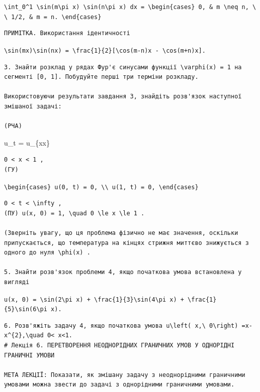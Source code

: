 \documentclass[
  ukrainian,
]{article}
\begin{document}
\texttt{\textbackslash{}int\_0\^{}1\ \textbackslash{}sin(m\textbackslash{}pi\ x)\ \textbackslash{}sin(n\textbackslash{}pi\ x)\ dx\ =\ \textbackslash{}begin\{cases\}\ 0,\ \&\ m\ \textbackslash{}neq\ n,\ \textbackslash{}\textbackslash{}\ 1/2,\ \&\ m\ =\ n.\ \textbackslash{}end\{cases\}}

\begin{verbatim}
ПРИМІТКА. Використання ідентичності
\end{verbatim}

\texttt{\textbackslash{}sin(mx)\textbackslash{}sin(nx)\ =\ \textbackslash{}frac\{1\}\{2\}{[}\textbackslash{}cos(m-n)x\ -\ \textbackslash{}cos(m+n)x{]}.}

\begin{verbatim}
3. Знайти розклад у рядах Фур'є синусами функції \varphi(x) = 1 на сегменті [0, 1]. Побудуйте перші три терміни розкладу.

Використовуючи результати завдання 3, знайдіть розв'язок наступної змішаної задачі:

(PЧА)
\end{verbatim}

u\_t = u\_\{xx\}

\begin{verbatim}
0 < x < 1 , 
(ГУ)
\end{verbatim}

\texttt{\textbackslash{}begin\{cases\}\ u(0,\ t)\ =\ 0,\ \textbackslash{}\textbackslash{}\ u(1,\ t)\ =\ 0,\ \textbackslash{}end\{cases\}}

\begin{verbatim}
0 < t < \infty , 
(ПУ) u(x, 0) = 1, \quad 0 \le x \le 1 .

(Зверніть увагу, що ця проблема фізично не має значення, оскільки припускається, що температура на кінцях стрижня миттєво знижується з одного до нуля \phi(x) .

5. Знайти розв'язок проблеми 4, якщо початкова умова встановлена у вигляді
\end{verbatim}

\texttt{u(x,\ 0)\ =\ \textbackslash{}sin(2\textbackslash{}pi\ x)\ +\ \textbackslash{}frac\{1\}\{3\}\textbackslash{}sin(4\textbackslash{}pi\ x)\ +\ \textbackslash{}frac\{1\}\{5\}\textbackslash{}sin(6\textbackslash{}pi\ x).}

\begin{verbatim}
6. Розв'яжіть задачу 4, якщо початкова умова u\left( x,\ 0\right) =x-x^{2},\quad 0< x<1. 
# Лекція 6. ПЕРЕТВОРЕННЯ НЕОДНОРІДНИХ ГРАНИЧНИХ УМОВ У ОДНОРІДНІ ГРАНИЧНІ УМОВИ

МЕТА ЛЕКЦІЇ: Показати, як змішану задачу з неоднорідними граничними умовами можна звести до задачі з однорідними граничними умовами.
\end{verbatim}
\end{document}
